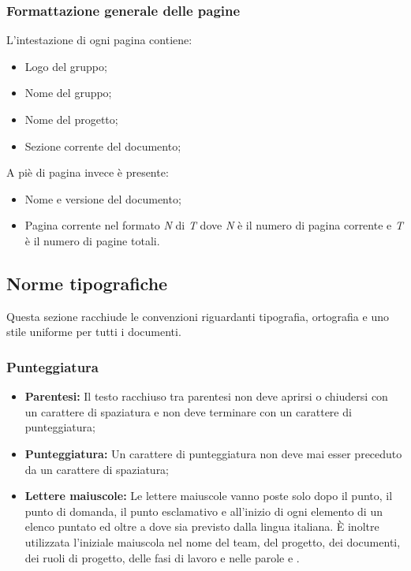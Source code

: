       \subsubsection{Formattazione generale delle pagine}
        L’intestazione di ogni pagina contiene:
        \begin{itemize}
          \item Logo del gruppo;
          \item Nome del gruppo;
          \item Nome del progetto;
          \item Sezione corrente del documento;
        \end{itemize}
        A piè di pagina invece è presente:
        \begin{itemize}
          \item Nome e versione del documento;
          \item Pagina corrente nel formato \emph{N} di \emph{T} dove \emph{N} è il numero di pagina corrente e \emph{T} è il numero di pagine totali.
        \end{itemize}
    \subsection{Norme tipografiche}
      Questa sezione racchiude le convenzioni riguardanti tipografia, ortografia e uno stile uniforme per tutti i documenti.
      \subsubsection{Punteggiatura}
        \begin{itemize}
          \item \textbf{Parentesi: }Il testo racchiuso tra parentesi non deve aprirsi o chiudersi con un carattere di spaziatura e non deve terminare con un carattere di punteggiatura;
          \item \textbf{Punteggiatura: }Un carattere di punteggiatura non deve mai esser preceduto da un carattere di spaziatura;
          \item \textbf{Lettere maiuscole: }Le lettere maiuscole vanno poste solo dopo il punto, il punto di domanda, il punto esclamativo e all’inizio di ogni elemento di un elenco puntato ed
          oltre a dove sia previsto dalla lingua italiana. È inoltre utilizzata l’iniziale maiuscola nel nome del team, del progetto, dei documenti, dei ruoli di progetto, delle fasi di
          lavoro e nelle parole  e .
        \end{itemize}
